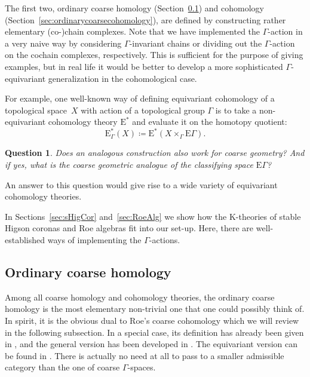 \documentclass[pdftex]{sigma}
\numberwithin{equation}{section}
\newtheorem{question}[thm]{Question}
\theoremstyle{definition}
\newcommand{\Cohom}{\mathrm{E}}
\newcommand{\K}{\mathrm{K}}
\begin{document}
The first two, ordinary coarse homology (Section~\ref{sec:ordinarycoarsehomology}) and cohomology (Section~\ref{sec:ordinarycoarsecohomology}), are defined by constructing rather elementary \mbox{(co-)}chain complexes. Note that we have implemented the $\Gamma$-action in a very naive way by considering $\Gamma$-invariant chains or dividing out the $\Gamma$-action on the cochain complexes, respectively. This is sufficient for the purpose of giving examples, but in real life it would be better to develop a more sophisticated $\Gamma$-equivariant generalization in the cohomological case.

For example, one well-known way of defining equivariant cohomology of a topological space~$X$ with action of a topological group $\Gamma$ is to take a non-equivariant cohomology theory $\Cohom^*$ and evaluate it on the homotopy quotient:
\[
\Cohom_\Gamma^*(X)\coloneqq\Cohom^*(X\times_\Gamma\mathrm{E}\Gamma).
\]

\begin{question}
Does an analogous construction also work for coarse geometry? And if yes, what is the coarse geometric analogue of the classifying space $\mathrm{E}\Gamma$?
\end{question}
An answer to this question would give rise to a wide variety of equivariant cohomology theories.

In Sections~\ref{sec:sHigCor} and~\ref{sec:RoeAlg} we show how the $\K$-theories of stable Higson coronas and Roe algebras fit into our set-up. Here, there are well-established ways of implementing the $\Gamma$-actions.

\subsection{Ordinary coarse homology}
\label{sec:ordinarycoarsehomology}

Among all coarse homology and cohomology theories, the ordinary coarse homology is the most elementary non-trivial one that one could possibly think of. In spirit, it is the obvious dual to Roe's coarse cohomology which we will review in the following subsection. In a special case, its definition has already been given in \cite[p.~453]{YuCyclicCohomology}, and the general version has been developed in \cite[Section~6.3]{BunkeEngel_homotopy}. The equivariant version can be found in \cite[Section~7]{BunkeEngelKasprowskiWinges}. There is actually no need at all to pass to a smaller admissible category than the one of coarse $\Gamma$-spaces.
\end{document}
